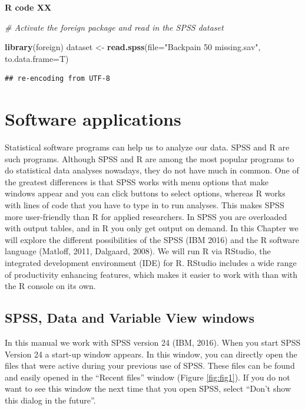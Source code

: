 \documentclass[]{book}
\newenvironment{Shaded}{\begin{snugshade}}{\end{snugshade}}
\newcommand{\KeywordTok}[1]{\textcolor[rgb]{0.13,0.29,0.53}{\textbf{#1}}}
\newcommand{\DataTypeTok}[1]{\textcolor[rgb]{0.13,0.29,0.53}{#1}}
\newcommand{\StringTok}[1]{\textcolor[rgb]{0.31,0.60,0.02}{#1}}
\newcommand{\CommentTok}[1]{\textcolor[rgb]{0.56,0.35,0.01}{\textit{#1}}}
\newcommand{\NormalTok}[1]{#1}
\theoremstyle{definition}
\theoremstyle{definition}
\theoremstyle{definition}
\theoremstyle{remark}
\begin{document}
\textbf{R code XX}

\begin{Shaded}
\begin{Highlighting}[]
\CommentTok{# Activate the foreign package and read in the SPSS dataset}

\KeywordTok{library}\NormalTok{(foreign)}
\NormalTok{dataset <-}\StringTok{ }\KeywordTok{read.spss}\NormalTok{(}\DataTypeTok{file=}\StringTok{"Backpain 50 missing.sav"}\NormalTok{, }\DataTypeTok{to.data.frame=}\NormalTok{T)}
\end{Highlighting}
\end{Shaded}

\begin{verbatim}
## re-encoding from UTF-8
\end{verbatim}

\chapter{Software applications}\label{software-applications}

Statistical software programs can help us to analyze our data. SPSS and
R are such programs. Although SPSS and R are among the most popular
programs to do statistical data analyses nowadays, they do not have much
in common. One of the greatest differences is that SPSS works with menu
options that make windows appear and you can click buttons to select
options, whereas R works with lines of code that you have to type in to
run analyses. This makes SPSS more user-friendly than R for applied
researchers. In SPSS you are overloaded with output tables, and in R you
only get output on demand. In this Chapter we will explore the different
possibilities of the SPSS (IBM 2016) and the R software language
(Matloff, 2011, Dalgaard, 2008). We will run R via RStudio, the
integrated development environment (IDE) for R. RStudio includes a wide
range of productivity enhancing features, which makes it easier to work
with than with the R console on its own.

\section{SPSS, Data and Variable View
windows}\label{spss-data-and-variable-view-windows}

In this manual we work with SPSS version 24 (IBM, 2016). When you start
SPSS Version 24 a start-up window appears. In this window, you can
directly open the files that were active during your previous use of
SPSS. These files can be found and easily opened in the ``Recent files''
window (Figure \ref{fig:fig1}). If you do not want to see this window
the next time that you open SPSS, select ``Don't show this dialog in the
future''.
\end{document}
